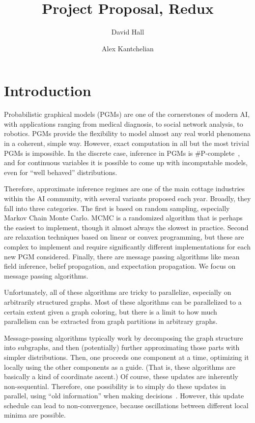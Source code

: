 \documentclass[12pt,leqno,twoside]{article}
\title{Project Proposal, Redux}
\author{David Hall \and Alex Kantchelian}
\begin{document}
\maketitle

\section{Introduction}

Probabilistic graphical models (PGMs) are one of the cornerstones
of modern AI, with applications ranging from medical diagnosis, to
social network analysis, to robotics. PGMs provide the flexibility
to model almost any real world phenomena in a coherent, simple way.
However, exact computation in all but the most trivial PGMs is
impossible. In the discrete case, inference in PGMs is
\#P-complete~\citep{Koller2009pgm}, and for continuous variables it is
possible to come up with incomputable models, even for ``well
behaved'' distributions.~\citep{AFR11}

Therefore, approximate inference regimes are one of the main cottage
industries within the AI community, with several variants proposed
each year. Broadly, they fall into three categories. The first is
based on random sampling, especially Markov Chain Monte Carlo. MCMC
is a randomized algorithm that is perhaps the easiest to implement, though
it almost always the slowest in practice. Second are relaxation techniques
based on linear or convex programming, but these are complex to implement
and require significantly different implementations for each new PGM
considered. Finally, there are message passing algorithms
like mean field inference, belief propagation, and expectation propagation.
We focus on message passing algorithms.

Unfortunately, all of these algorithms are tricky to parallelize, especially on
arbitrarily structured graphs. Most of these algorithms can be
parallelized to a certain extent given a graph coloring, but there
is a limit to how much parallelism can be extracted from graph
partitions in arbitrary graphs.

Message-passing algorithms typically work by decomposing the graph
structure into subgraphs, and then (potentially) further approximating
those parts with simpler distributions. Then, one proceeds one
component at a time, optimizing it locally using the other components
as a guide. (That is, these algorithms are basically a kind of
coordinate ascent.) Of course, these updates are inherently
non-sequential. Therefore, one possibility is to simply do these
updates in parallel, using ``old information'' when making decisions~\citep{CsekeHeskes2010}. However, this update schedule can lead to
non-convergence, because oscillations between different local minima
are possible.
\end{document}
